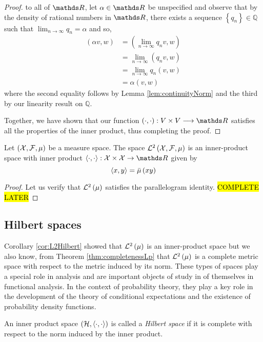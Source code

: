 \begin{proof}
to all of $\R$, let $\alpha\in\R$ be unspecified and observe that
by the density of rational numbers in $\R$, there exists a sequence
$\left\{ q_{n}\right\} \in\mathds{Q}$ such that $\lim_{n\to\infty}q_{n}=\alpha$
and so, 
\begin{align*}
\left(\alpha v,w\right) & =\left(\lim_{n\to\infty}q_{n}v,w\right)\\
 & =\lim_{n\to\infty}\left(q_{n}v,w\right)\\
 & =\lim_{n\to\infty}q_{n}\left(v,w\right)\\
 & =\alpha\left(v,w\right)
\end{align*}
where the second equality follows by Lemma \ref{lem:continuityNorm}
and the third by our linearity result on $\mathds{Q}.$

Together, we have shown that our function $\left(\cdot,\cdot\right):V\times V\longrightarrow\R$
satisfies all the properties of the inner product, thus completing
the proof.
\end{proof}
\begin{cor}
\label{cor:L2Hilbert}Let $\left(\mathcal{X},\mathcal{F},\mu\right)$ be a measure space.
The space $\mathcal{L}^{2}\left(\mathcal{X},\mathcal{F},\mu\right)$ is an inner-product space with inner
product $\innerproduct{\cdot}{\cdot}:\X\times\X\to\R$ given by
\[
\langle x,y\rangle=\bar{\mu}\left(xy\right)
\]
\end{cor}

\begin{proof}
Let us verify that $\mathcal{L}^{2}\left(\mu\right)$ satisfies the parallelogram identity.
\hl{COMPLETE LATER}
\end{proof}

\subsection{Hilbert spaces}

Corollary \ref{cor:L2Hilbert} showed that $\mathcal{L}^{2}\left(\mu\right)$ is an inner-product
space but we also know, from Theorem \ref{thm:completenessLp} that
$\mathcal{L}^{2}\left(\mu\right)$ is a complete metric space with respect to the metric
induced by its norm. These types of spaces play a special role in
analysis and are important objects of study in of themselves in functional
analysis. In the context of probability theory, they play a key role
in the development of the theory of conditional expectations and the
existence of probability density functions.
\begin{defn}
\label{def:hilbertSpace}An inner product space $\left(\mathcal{H},\langle\cdot,\cdot\rangle\right)$
is called a \emph{Hilbert space }if it is complete with respect to
the norm induced by the inner product.
\end{defn}

